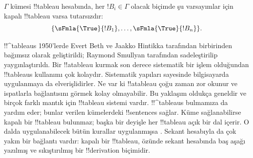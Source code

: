 $\Gamma$ kümesi !!{tableau} hesabında, her $!B_i\in\Gamma$ olacak biçimde
şu varsayımlar için kapalı !!{tableau} varsa tutarsızdır:
\[
\{\sFmla{\True}{!B_1}, \dots, \sFmla{\True}{!B_n}\}.
\]

!!^{tableau}s 1950'lerde Evert Beth ve Jaakko Hintikka tarafından birbirinden
bağımsız olarak geliştirildi; Raymond Smullyan tarafından sadeleştirilip
yaygınlaştırıldı. Bir !!a{tableau} kurmak son derece sistematik bir işlem
olduğundan !!{tableau}s kullanımı çok kolaydır. Sistematik yapıları sayesinde
bilgisayarda uygulanmaya da elverişlidirler. Ne var ki !!a{tableau} çoğu
zaman zor okunur ve ispatlarla bağlantısını görmek kolay olmayabilir. Bu
yaklaşım oldukça geneldir ve birçok farklı mantık için !!{tableau} sistemi
vardır. !!^{tableau}s  bulmamıza da
yardım eder; bunlar verilen kümelerdeki !!{sentence}s sağlar. Küme
sağlanabilirse kapalı bir !!{tableau} bulunmaz; başka bir deyişle her
!!{tableau} açık bir dal içerir. O dalda uygulanabilecek bütün kurallar
uygulanmışsa . Sekant hesabıyla
da çok yakın bir bağlantı vardır: kapalı bir !!{tableau}, özünde sekant
hesabında baş aşağı yazılmış ve sıkıştırılmış bir !!{derivation} biçimidir.

